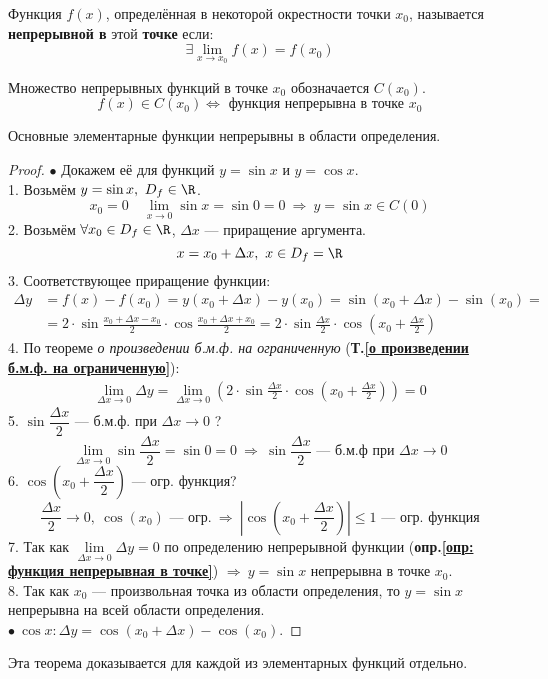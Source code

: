 \begin{definition}
  Функция $f(x)$, определённая в некоторой окрестности точки $x_0$, называется \textbf{непрерывной в} этой \textbf{точке} если: \[
    \exists \lim_{x \to x_0} f(x) = f(x_0)
  \]
\end{definition}
\begin{note}
  Множество непрерывных функций в точке $x_0$ обозначается $C(x_0)$. 
  \[
    f(x) \in C(x_0) \iff \text{ функция непрерывна в точке } x_0
  \] 
\end{note}
\begin{theorem}
  Основные элементарные функции непрерывны в области определения.
\end{theorem}
\begin{proof}
  $\bullet$ Докажем её для функций $y = \sin x$ и $y=\cos x$. \\
  1. Возьмём $y = \sin x,\ D_f \in \R$.
  \[ x_0 = 0\quad \lim\limits_{x \to 0} \sin x = \sin 0 = 0\ \Rightarrow\ y= \sin x \in C(0) \]
  2. Возьмём $\forall x_0 \in D_f \in \R$, $\Delta x$ --- приращение аргумента.
  \[ x = x_0 + \Delta x ,\ x \in D_f = \R \]
  3. Соответствующее приращение функции:
  \begin{align*}
    \Delta y &= f(x) - f(x_0) = y(x_0 + \Delta x) - y(x_0) = \sin(x_0 + \Delta x) - \sin(x_0) = \\
    &= 2\cdot \sin \frac{x_0 + \Delta x - x_0}{2}\cdot \cos \frac{x_0 + \Delta x + x_0}{2} = 2\cdot \sin \frac{\Delta x}{2}\cdot \cos \left( x_0 + \frac{\Delta x}{2} \right)
  \end{align*}
  4. По теореме \textit{о произведении б.м.ф. на ограниченную} (\textbf{Т.\ref{о произведении б.м.ф. на ограниченную}}):
  \begin{gather*}
    \lim\limits_{\Delta x \to 0} \Delta y = \lim\limits_{\Delta x \to 0} \left( 2\cdot \sin \frac{\Delta x}{2}\cdot \cos \left(x_0 + \frac{\Delta x}{2} \right) \right) = 0
  \end{gather*}
  5. $\sin \dfrac{\Delta x}{2}$ --- б.м.ф. при $\Delta x \to 0$ ?
  \[ \lim\limits_{\Delta x \to 0} \sin \frac{\Delta x}{2} = \sin 0 = 0\ \Rightarrow\ \sin \frac{\Delta x}{2} \text{ --- б.м.ф при } \Delta x \to 0 \]
  6. $\cos \left( x_0 + \dfrac{\Delta x }{2} \right)$ --- огр. функция?
    \[ \frac{\Delta x}{2} \to 0,\ \cos(x_0) \text{ --- огр.}\ \Rightarrow\ \left| \cos \left( x_0 + \frac{\Delta x}{2} \right) \right| \le 1 \text{ --- огр. функция} \]
  7. Так как $\lim\limits_{\Delta x \to 0} \Delta y = 0$ по определению непрерывной функции (\textbf{опр.\ref{опр: функция непрерывная в точке}}) $\Rightarrow\ y = \sin x$ непрерывна в точке $x_0$. \\
  8. Так как $x_0$ --- произвольная точка из области определения, то $y = \sin x$ непрерывна на всей области определения. \\[1ex]
  $\bullet\  \cos x\colon \Delta y = \cos(x_0 + \Delta x) - \cos (x_0)$.
\end{proof}
\begin{remark}
  Эта теорема доказывается для каждой из элементарных функций отдельно.
\end{remark}
\newpage
